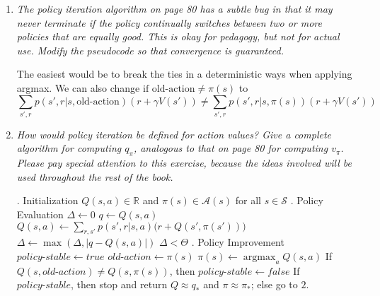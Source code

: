 \documentclass[12pt,a4paper]{article}
\DeclareMathOperator*{\argmax}{argmax}
\begin{document}
\begin{enumerate}
  \item
    \textit{The policy iteration algorithm on page 80 has a subtle bug in that it may
    never terminate if the policy continually switches between two or more policies that are
    equally good. This is okay for pedagogy, but not for actual use. Modify the pseudocode
    so that convergence is guaranteed.}

    The easiest would be to break the ties in a deterministic ways when applying argmax.
    We can also change $\text{if old-action} \neq \pi(s)$ to
    \[
    \sum\limits_{s', r} p(s', r | s, \text{old-action}) (r + \gamma V(s')) \neq
    \sum\limits_{s', r} p(s', r | s, \pi(s)) (r + \gamma V(s'))
    \]

  \item
    \textit{How would policy iteration be defined for action values? Give a complete
    algorithm for computing $q_\pi$, analogous to that on page 80 for computing $v_\pi$. Please pay
    special attention to this exercise, because the ideas involved will be used throughout the
    rest of the book.}

    \begin{algorithmic}
      . Initialization
      \STATE $Q(s, a) \in \mathbb{R}$ and $\pi(s) \in \mathcal{A}(s)$ for all $s \in \mathcal{S}$
      \STATE
      . Policy Evaluation
      \REPEAT
      \STATE $\Delta \leftarrow 0$
      \STATE $q \leftarrow Q(s, a)$
      \STATE $Q(s, a) \leftarrow \sum\limits_{r, s'} p(s', r | s, a) \Big(r + Q(s', \pi(s'))\Big)$
      \STATE $\Delta \leftarrow \max(\Delta, |q - Q(s, a)|)$
      \ENDFOR
      \ENDFOR
      \UNTIL $\Delta < \Theta$
      \STATE
      . Policy Improvement
      \STATE $\textit{policy-stable} \leftarrow true$
      \STATE $\textit{old-action} \leftarrow \pi(s)$
      \STATE $\pi(s) \leftarrow \argmax_a Q(s, a)$
      \STATE If $Q(s, \textit{old-action}) \neq Q(s, \pi(s))$, then $\textit{policy-stable} \leftarrow false$
      \ENDFOR
      \STATE If $\textit{policy-stable}$, then stop and return $Q \approx q_\ast$ and
      $\pi \approx \pi_\ast$; else go to $2$.
    \end{algorithmic}


\end{enumerate}
\end{document}
